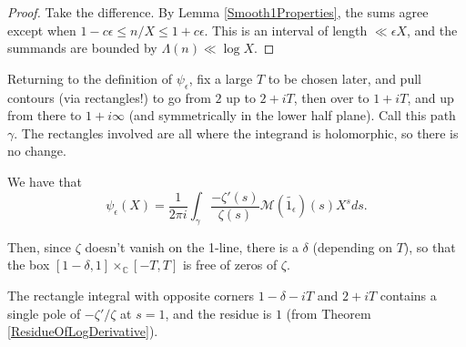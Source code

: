 \begin{proof}
Take the difference. By Lemma \ref{Smooth1Properties}, the sums agree except when $1-c \epsilon \leq n/X \leq 1+c \epsilon$. This is an interval of length $\ll \epsilon X$, and the summands are bounded by $\Lambda(n) \ll \log X$.
\end{proof}



Returning to the definition of $\psi_{\epsilon}$, fix a large $T$ to be chosen later, and pull contours (via rectangles!) to go
from $2$ up to $2+iT$, then over to $1+iT$, and up from there to $1+i\infty$ (and symmetrically in the lower half plane). Call
this path $\gamma$. The
rectangles involved are all where the integrand is holomorphic, so there is no change.
\begin{theorem}\label{SmoothedChebyshevPull1}
We have that
$$\psi_{\epsilon}(X) = \frac{1}{2\pi i}\int_{\gamma}\frac{-\zeta'(s)}{\zeta(s)}
\mathcal{M}(\widetilde{1_{\epsilon}})(s)
X^{s}ds.$$
\end{theorem}



Then, since $\zeta$ doesn't vanish on the 1-line, there is a $\delta$ (depending on $T$), so that the box $[1-\delta,1] \times_{ℂ} [-T,T]$ is free of zeros of $\zeta$.

The rectangle integral with opposite corners $1-\delta - i T$ and $2+iT$ contains a single pole of $-\zeta'/\zeta$ at $s=1$, and the residue is $1$ (from Theorem \ref{ResidueOfLogDerivative}).


